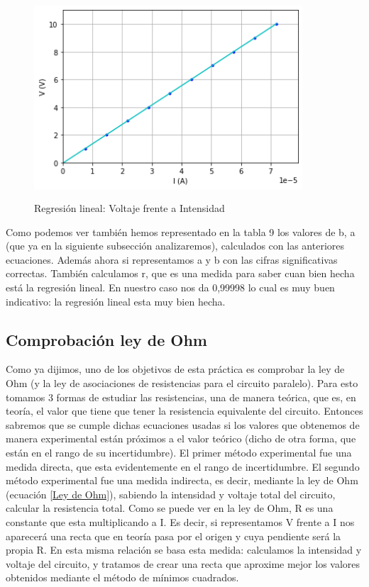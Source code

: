 \documentclass[10pt,a4paper]{article}
\begin{document}
\begin{figure}[h!] %
\centering
\includegraphics[width=10cm, height=7.5cm]{Plot}
\caption{Regresión lineal: Voltaje frente a Intensidad}
\label{fig: Resistencias}
\end{figure}
\newpage
Como podemos ver también hemos representado en la tabla 9 los valores de b, a (que ya en la siguiente subsección analizaremos), calculados con las anteriores ecuaciones. Además ahora si representamos a y b con las cifras significativas correctas. También calculamos r, que es una medida para saber cuan bien hecha está la regresión lineal. En nuestro caso nos da 0,99998 lo cual es muy buen indicativo: la regresión lineal esta muy bien hecha. 

\subsection{Comprobación ley de Ohm}
Como ya dijimos, uno de los objetivos de esta práctica es comprobar la ley de Ohm (y la ley de asociaciones de resistencias para el circuito paralelo). Para esto tomamos 3 formas de estudiar las resistencias, una de manera teórica, que es, en teoría, el valor que tiene que tener la resistencia equivalente del circuito. Entonces sabremos que se cumple dichas ecuaciones usadas si los valores que obtenemos de manera experimental están próximos a el valor teórico (dicho de otra forma, que están en el rango de su incertidumbre). El primer método experimental fue una medida directa, que esta evidentemente en el rango de incertidumbre. El segundo método experimental fue una medida indirecta, es decir, mediante la ley de Ohm (ecuación \ref{Ley de Ohm}), sabiendo la intensidad y voltaje total del circuito, calcular la resistencia total. Como se puede ver en la ley de Ohm, R es una constante que esta multiplicando a I. Es decir, si representamos V frente a I nos aparecerá una recta que en teoría pasa por el origen y cuya pendiente será la propia R. En esta misma relación se basa esta medida: calculamos la intensidad y voltaje del circuito, y tratamos de crear una recta que aproxime mejor los valores obtenidos mediante el método de mínimos cuadrados.  \\
\end{document}
